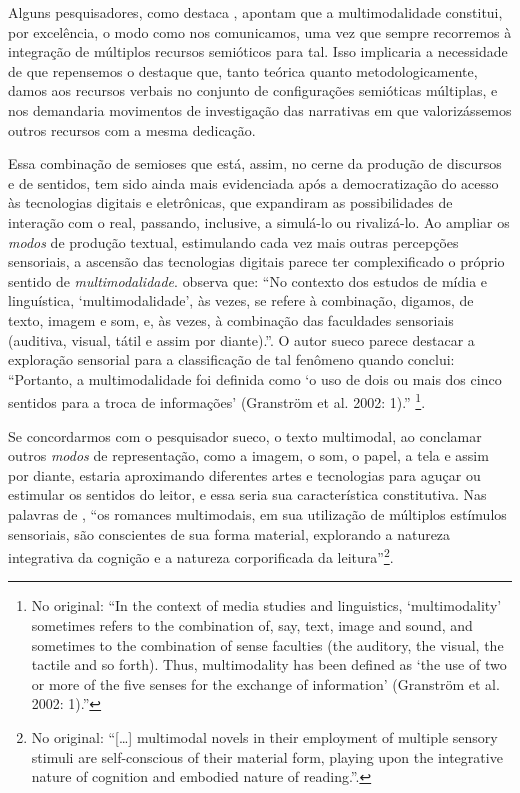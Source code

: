 \documentclass[portuguese]{textolivre}
\begin{document}
Alguns pesquisadores, como destaca \textcite{page_new_2010}, apontam que a
multimodalidade constitui, por excelência, o modo como nos comunicamos, uma vez
que sempre recorremos à integração de múltiplos recursos semióticos para tal.
Isso implicaria a necessidade de que repensemos o destaque que, tanto teórica
quanto metodologicamente, damos aos recursos verbais no conjunto de
configurações semióticas múltiplas, e nos demandaria movimentos de investigação
das narrativas em que valorizássemos outros recursos com a mesma dedicação.

Essa combinação de semioses que está, assim, no cerne da produção de discursos
e de sentidos, tem sido ainda mais evidenciada após a democratização do acesso
às tecnologias digitais e eletrônicas, que expandiram as possibilidades de
interação com o real, passando, inclusive, a simulá-lo ou rivalizá-lo. Ao
ampliar os \textit{modos} de produção textual, estimulando cada vez mais outras
percepções sensoriais, a ascensão das tecnologias digitais parece ter
complexificado o próprio sentido de \textit{multimodalidade}.
\textcite{ellestrom_modalities_2021} observa que: “No contexto dos estudos de
mídia e linguística, ‘multimodalidade’, às vezes, se refere à combinação,
digamos, de texto, imagem e som, e, às vezes, à combinação das faculdades
sensoriais (auditiva, visual, tátil e assim por diante).”. O autor sueco parece
destacar a exploração sensorial para a classificação de tal fenômeno quando
conclui: “Portanto, a multimodalidade foi definida como ‘o uso de dois ou mais
dos cinco sentidos para a troca de informações’ (Granström et al. 2002: 1).”
\cite[p.~41, tradução nossa]{ellestrom_modalities_2021}\footnote{
    No original:
    “In the context of media studies and linguistics, ‘multimodality’ sometimes
    refers to the combination of, say, text, image and sound, and sometimes to the
    combination of sense faculties (the auditory, the visual, the tactile and so
    forth). Thus, multimodality has been defined as ‘the use of two or more of the
    five senses for the exchange of information’ (Granström et al. 2002: 1).”}.

Se concordarmos com o pesquisador sueco, o texto multimodal, ao conclamar
outros \textit{modos} de representação, como a imagem, o som, o papel, a tela e
assim por diante, estaria aproximando diferentes artes e tecnologias para
aguçar ou estimular os sentidos do leitor, e essa seria sua característica
constitutiva. Nas palavras de \textcite[p.~100]{gibbons_i_2010}, “os romances
multimodais, em sua utilização de múltiplos estímulos sensoriais, são
conscientes de sua forma material, explorando a natureza integrativa da
cognição e a natureza corporificada da leitura”\footnote{No original: “[…]
multimodal novels in their employment of multiple sensory stimuli are
self-conscious of their material form, playing upon the integrative nature of
cognition and embodied nature of reading.”.}.
\end{document}
